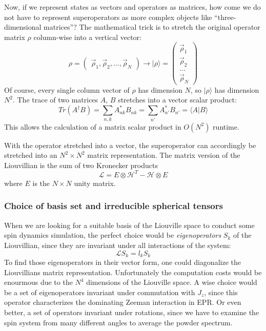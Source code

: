 \documentclass[11.5pt,a4paper]{article}
\begin{document}
Now, if we represent states as vectors and operators as matrices, how come we do not have to represent superoperators as more complex objects like ``three-dimensional matrices''? The mathematical trick is to stretch the original operator matrix $\rho$ column-wise into a vertical vector:
\begin{equation}
 \rho = \begin{pmatrix} \vec{\rho}_1,\vec{\rho}_2,\ldots,\vec{\rho}_N \end{pmatrix} \rightarrow
  |\rho \rangle = \begin{pmatrix} \vec{\rho}_1 \\ \vec{\rho}_2 \\ \ldots \\ \vec{\rho}_N \end{pmatrix} 
\end{equation}
Of course, every single column vector of $\rho$ has dimension $N$, so $|\rho\rangle$ has dimension $N^2$. The trace of two matrices $A$, $B$ stretches into a vector scalar product:
\begin{equation}
 Tr( A^\dagger B ) = \sum_{n,k} A_{nk}^* B_{nk} = \sum_{n'} A_{n'}^* B_{n'} = \langle A | B \rangle
\end{equation}
This allows the calculation of a matrix scalar product in $O(N^2)$ runtime.

With the operator stretched into a vector, the superoperator can accordingly be stretched into an $N^2 \times N^2$ matrix representation. The matrix version of the Liouvillian is the sum of two Kronecker products
\begin{equation}
 \mathcal{L} = E \otimes \mathcal{H}^T - \mathcal{H} \otimes E
\end{equation}
where $E$ is the $N \times N$ unity matrix. 

\subsubsection{Choice of basis set and irreducible spherical tensors}
When we are looking for a suitable basis of the Liouville space to conduct some spin dynamics simulation, the perfect choice would be \emph{eigenoperators} $S_k$ of the Liouvillian, since they are invariant under all interactions of the system:
\begin{equation}
  \mathcal{L} S_k = l_k S_k
\end{equation}
To find those eigenoperators in their vector form, one could diagonalize the Liouvillians matrix representation. Unfortunately the computation costs would be enourmous due to the $N^4$ dimensions of the Liouville space. A wise choice would be a set of eigenoperators invariant under commutation with $J_z$, since this operator characterizes the dominating Zeeman interaction in EPR. Or even better, a set of operators invariant under rotations, since we have to examine the spin system from many different angles to average the powder spectrum.
\end{document}
